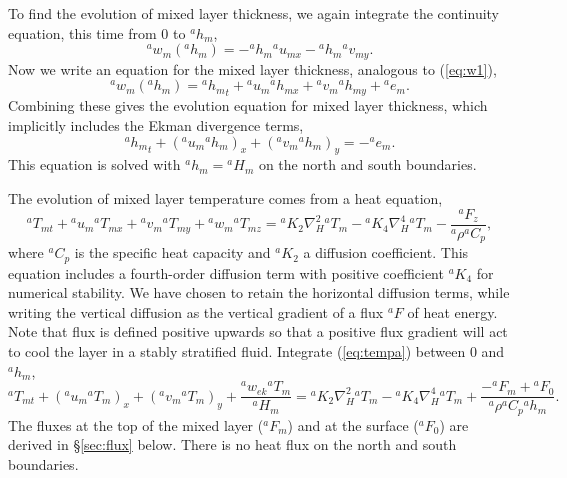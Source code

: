\documentclass[11pt, a4paper,twoside]{article}
\newcommand{\rhb}[1]{{{}^{#1}\rho}}
\newcommand{\cp}[1]{{{}^{#1}C_p}}
\newcommand{\uu}[2]{{{}^{#1}u_{#2}}}
\newcommand{\vv}[2]{{{}^{#1}v_{#2}}}
\newcommand{\ww}[2]{{{}^{#1}w_{#2}}}
\newcommand{\ek}[1]{{{}^{#1}w_{ek}}}
\newcommand{\HH}[2]{{{}^{#1}H_{#2}}}
\newcommand{\kh}[1]{{{}^{#1}K_2}}
\newcommand{\kf}[1]{{{}^{#1}K_4}}
\newcommand{\e}[2]{{{}^{#1}e_{#2}}}
\newcommand{\h}[2]{{{}^{#1}h_{#2}}}
\newcommand{\T}[2]{{{}^{#1}T_{#2}}}
\newcommand{\F}[3]{{{}^{#1}F^{#3}_{#2}}}
\numberwithin{equation}{section}
\begin{document}
To find the evolution of mixed layer thickness, we again integrate the continuity equation, this time from $0$ to $\h{a}{m}$,
\begin{equation}\ww{a}{m}(\h{a}{m}) = - \h{a}{m}\uu{a}{mx} - \h{a}{m}\vv{a}{my}.\end{equation}
Now we write an equation for the mixed layer thickness, analogous to (\ref{eq:w1}),
\begin{equation}\label{eq:w0a}
\ww{a}{m}(\h{a}{m}) = \h{a}{m}_t + \uu{a}{m}\h{a}{mx} + \vv{a}{m} \h{a}{my}  + \e{a}{m}.
\end{equation}
Combining these gives the evolution equation for mixed layer thickness, which implicitly includes the Ekman divergence terms,
\begin{equation}\label{eq:hevmat}
\h{a}{m}_t + (\uu{a}{m}\h{a}{m})_x + (\vv{a}{m} \h{a}{m})_y =   - \e{a}{m}.
\end{equation}
This equation is solved with $\h{a}{m} = \HH{a}{m}$ on the north and south boundaries.

The evolution of mixed layer temperature comes from a heat equation,
\begin{equation}\label{eq:tempa}
\T{a}{mt} + \uu{a}{m} \T{a}{mx} + \vv{a}{m} \T{a}{my} + \ww{a}{m} \T{a}{mz} =  \kh{a} \nabla_H^2 \T{a}{m} - \kf{a}\nabla_H^4\T{a}{m} - \frac{{}^aF_z}{\rhb{a} \cp{a}},
\end{equation}
where $\cp{a}$ is the specific heat capacity and $\kh{a}$ a diffusion coefficient.
This equation includes a fourth-order diffusion term with positive coefficient $\kf{a}$ for numerical stability.
We have chosen to retain the horizontal diffusion terms, while writing the vertical diffusion as the vertical gradient of a flux ${}^aF$ of heat energy.
Note that flux is defined positive upwards so that a positive flux gradient will act to cool the layer in a stably stratified fluid.
Integrate (\ref{eq:tempa}) between $0$ and $\h{a}{m}$, \begin{equation}\label{eq:tempc}
\T{a}{mt} + (\uu{a}{m} \T{a}{m})_x + (\vv{a}{m} \T{a}{m})_y + \frac{\ek{a}\T{a}{m}}{\HH{a}{m}}  =  \kh{a} \nabla_H^2 \T{a}{m} - \kf{a}\nabla_H^4\T{a}{m}+ \frac{-\F{a}{m}{} + \F{a}{0}{}}{\rhb{a} \cp{a} \h{a}{m}}.
\end{equation}
The fluxes at the top of the mixed layer ($\F{a}{m}{}$) and at the surface ($\F{a}{0}{}$) are derived in \S \ref{sec:flux} below.
There is no heat flux on the north and south boundaries.
\end{document}
